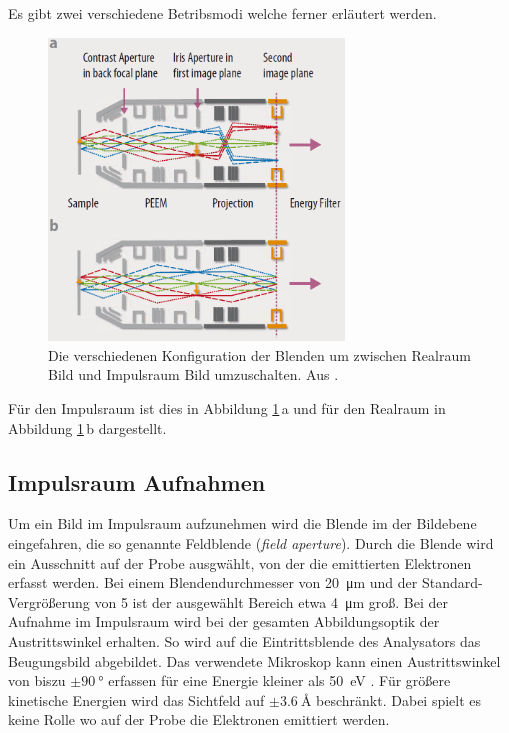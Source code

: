        Es gibt zwei verschiedene Betribsmodi welche ferner erläutert werden.
        \begin{figure}
            \centering
            \caption{Die verschiedenen Konfiguration der Blenden um zwischen Realraum Bild und Impulsraum Bild umzuschalten. Aus \cite{Focus}.}
            \label{fig:real_k}
            \includegraphics[width=0.7\textwidth]{./content/Real_k.PNG}
        \end{figure}
        Für den Impulsraum ist dies in Abbildung \ref{fig:real_k}\,a und für den Realraum in Abbildung \ref{fig:real_k}\,b dargestellt.

        \subsection{Impulsraum Aufnahmen}
            Um ein Bild im Impulsraum aufzunehmen wird die Blende im der Bildebene eingefahren, die so genannte Feldblende (\textit{field aperture}).
            Durch die Blende wird ein Ausschnitt auf der Probe ausgwählt, von der die emittierten Elektronen erfasst werden.
            Bei einem Blendendurchmesser von \SI{20}{\micro\meter} und der Standard-Vergrößerung von \num{5} ist der ausgewählt Bereich etwa \SI{4}{\micro\meter} groß.
            Bei der Aufnahme im Impulsraum wird bei der gesamten Abbildungsoptik der Austrittswinkel erhalten.
            So wird auf die Eintrittsblende des Analysators das Beugungsbild abgebildet.
            Das verwendete Mikroskop kann einen Austrittswinkel von biszu $\pm\SI{90}{\degree}$ erfassen für eine Energie kleiner als \SI{50}{\electronvolt} \cite[21]{SPECS-MM}.
            Für größere kinetische Energien wird das Sichtfeld auf $\pm\SI{3.6}{\angstrom}$ beschränkt.
            Dabei spielt es keine Rolle wo auf der Probe die Elektronen emittiert werden.


